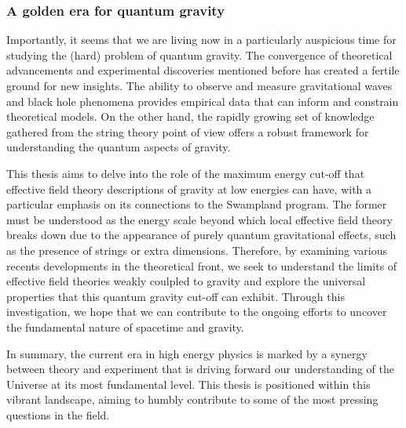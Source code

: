 
\subsubsection*{A golden era for quantum gravity}

Importantly, it seems that we are living now in a particularly auspicious time for studying the (hard) problem of quantum gravity. The convergence of theoretical advancements and experimental discoveries mentioned before has created a fertile ground for new insights. The ability to observe and measure gravitational waves and black hole phenomena provides empirical data that can inform and constrain theoretical models. On the other hand, the rapidly growing set of knowledge gathered from the string theory point of view offers a robust framework for understanding the quantum aspects of gravity.

This thesis aims to delve into the role of the maximum energy cut-off that effective field theory descriptions of gravity at low energies can have, with a particular emphasis on its connections to the Swampland program. The former must be understood as the energy scale beyond which local effective field theory breaks down due to the appearance of purely quantum gravitational effects, such as the presence of strings or extra dimensions. Therefore, by examining various recents developments in the theoretical front, we seek to understand the limits of effective field theories weakly coulpled to gravity and explore the universal properties that this quantum gravity cut-off can exhibit. Through this investigation, we hope that we can contribute to the ongoing efforts to uncover the fundamental nature of spacetime and gravity.

In summary, the current era in high energy physics is marked by a synergy between theory and experiment that is driving forward our understanding of the Universe at its most fundamental level. This thesis is positioned within this vibrant landscape, aiming to humbly contribute to some of the most pressing questions in the field.

